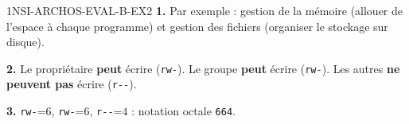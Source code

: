 \begin{corrige}{1NSI-ARCHOS-EVAL-B-EX2}
\textbf{1.} Par exemple : gestion de la mémoire (allouer de l'espace à chaque programme)
et gestion des fichiers (organiser le stockage sur disque).

\textbf{2.} Le propriétaire \textbf{peut} écrire (\lstinline{rw-}). Le groupe \textbf{peut}
écrire (\lstinline{rw-}). Les autres \textbf{ne peuvent pas} écrire (\lstinline{r--}).

\textbf{3.} \lstinline{rw-}=$6$, \lstinline{rw-}=$6$, \lstinline{r--}=$4$ : notation
octale \lstinline{664}.
\end{corrige}

